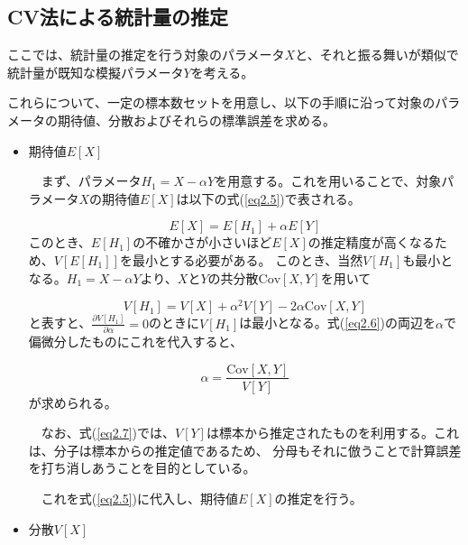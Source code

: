 \documentclass[a4paper,11pt,titlepage,uplatex]{jsreport}
\begin{document}
\subsection{CV法による統計量の推定}
ここでは、統計量の推定を行う対象のパラメータ$X$と、それと振る舞いが類似で統計量が既知な模擬パラメータ$Y$を考える。

これらについて、一定の標本数セットを用意し、以下の手順に沿って対象のパラメータの期待値、分散およびそれらの標準誤差を求める。

\begin{itemize}
  \item 期待値$E\left[X\right]$
  
  　まず、パラメータ$H_1 = X - \alpha Y$を用意する。これを用いることで、対象パラメータ$X$の期待値$E\left[X\right]$は以下の式(\ref{eq2.5})で表される。

  \begin{equation}
    E\left[X\right] = E\left[H_1\right] + \alpha E\left[Y\right]
    \label{eq2.5}
  \end{equation}
  このとき、$E\left[H_1\right]$の不確かさが小さいほど$E\left[X\right]$の推定精度が高くなるため、$V\left[E\left[H_1\right]\right]$を最小とする必要がある。
  このとき、当然$V\left[H_1\right]$も最小となる。$H_1 = X - \alpha Y$より、$X$と$Y$の共分散$\mathrm{Cov}\left[X,Y\right]$を用いて

  \begin{equation}
    V\left[H_1\right] = V\left[X\right] + \alpha^2 V\left[Y\right] - 2\alpha \mathrm{Cov}\left[X,Y\right]
    \label{eq2.6}
  \end{equation}
  と表すと、$\frac{\partial V\left[H_1\right]}{\partial\alpha} = 0$のときに$V\left[H_1\right]$は最小となる。式(\ref{eq2.6})の両辺を$\alpha$で偏微分したものにこれを代入すると、

  \begin{equation}
    \alpha = \frac{\mathrm{Cov}\left[X,Y\right]}{V\left[Y\right]}
    \label{eq2.7}
  \end{equation}
  が求められる。

  　なお、式(\ref{eq2.7})では、$V\left[Y\right]$は標本から推定されたものを利用する。これは、分子は標本からの推定値であるため、
  分母もそれに倣うことで計算誤差を打ち消しあうことを目的としている。
  
  　これを式(\ref{eq2.5})に代入し、期待値$E\left[X\right]$の推定を行う。

  \vspace{1.0\baselineskip}

  \item 分散$V\left[X\right]$ 
  

\end{itemize}
\end{document}
